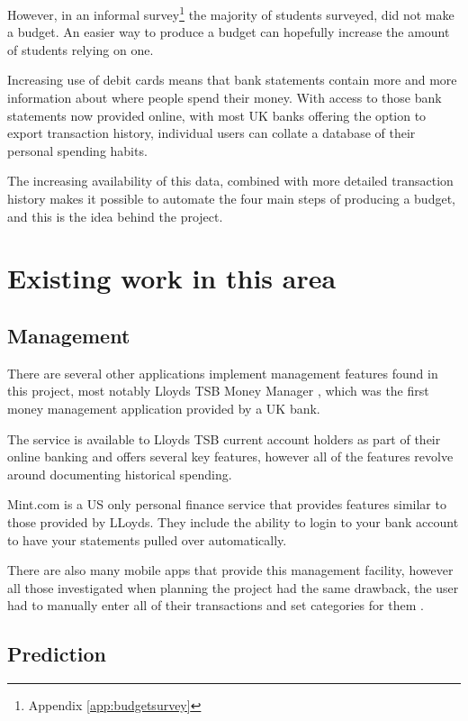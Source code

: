 However, in an informal survey\footnote{Appendix \ref{app:budgetsurvey}} the majority of students surveyed, did not make a budget. An easier way to produce a budget can hopefully increase the amount of students relying on one.

Increasing use of debit cards\cite{bbc2010debit} means that bank statements contain more and more information about where people spend their money. With access to those bank statements now provided online, with most UK banks offering the option to export \gls{transaction} history, individual users can collate a database of their personal spending habits.

The increasing availability of this data, combined with more detailed transaction history makes it possible to automate the four main steps of producing a budget, and this is the idea behind the project.

\section{Existing work in this area}

\subsection{Management}
There are several other applications  implement management features found in this project, most notably Lloyds TSB Money Manager \cite{lloyds2014money}, which was the first money management application provided by a UK bank.

The service is available to Lloyds TSB current account holders as part of their online banking and offers several key features, however all of the features revolve around documenting historical spending.

Mint.com is a US only personal finance service that provides features similar to those provided by LLoyds. They include the ability to login to your bank account to have your statements pulled over automatically.

There are also many mobile apps that provide this management facility, however all those investigated when planning the project had the same drawback, the user had to manually enter all of their transactions and set categories for them \cite{spendee2014spendee,budgt2013budgt,bluetags2014pocket}.

\subsection{Prediction}

